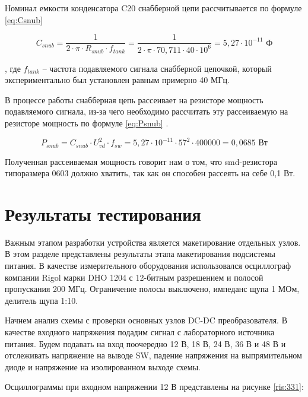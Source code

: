 Номинал емкости конденсатора C20 снабберной цепи рассчитывается по формуле \ref{eq:Csnub}

\begin{equation}
    C_{snub} = \frac{1}{2 \cdot \pi \cdot R_{snub} \cdot f_{tank}} =
    \frac{1}{2 \cdot \pi \cdot 70,711 \cdot 40 \cdot 10^{6}} =
    5,27 \cdot 10^{-11} \text{ Ф}
    \label{eq:Csnub}
 \end{equation}

, где $f_{tank}$ -- частота подавляемого сигнала снабберной цепочкой, который экспериментально был установлен
равным примерно 40 МГц. 

В процессе работы снабберная цепь рассеивает на резисторе мощность подавляемого сигнала, из-за чего необходимо 
рассчитать эту рассеиваемую на резисторе мощность по формуле \ref{eq:Psnub} \cite{Snubber:calculation}. 

\begin{equation}
P_{snub} = C_{snub} \cdot U_{vd}^{2} \cdot f_{sw} =  
5,27 \cdot 10^{-11} \cdot 57^{2} \cdot 400000 =
0,0685 \text{ Вт}
\label{eq:Psnub}
\end{equation}

Полученная рассеиваемая мощность говорит нам о том, что smd-резистора типоразмера 0603 должно хватить, 
так как он способен рассеять на себе 0,1 Вт. 

\section{Результаты тестирования}
\hspace{1cm} 

Важным этапом разработки устройства является макетирование отдельных узлов. В этом разделе представлены 
результаты этапа макетирования подсистемы питания. В качестве измерительного оборудования использовался 
осциллограф компании Rigol марки DHO 1204 с 12-битным разрешением и полосой пропускания 200 МГц. Ограничение 
полосы выключено, импеданс щупа 1 МОм, делитель щупа 1:10. 

Начнем анализ схемы с проверки основных узлов DC-DC преобразователя. В качестве входного напряжения подадим
сигнал с лабораторного источника питания. Будем подавать на вход поочередно 12 В, 18 В, 24 В, 36 В и 48 В и 
отслеживать напряжение на выводе SW, падение напряжения на выпрямительном диоде и напряжение на изолированном
выходе схемы. 

Осциллограммы при входном напряжении 12 В представлены на рисунке \ref{ris:331}:

